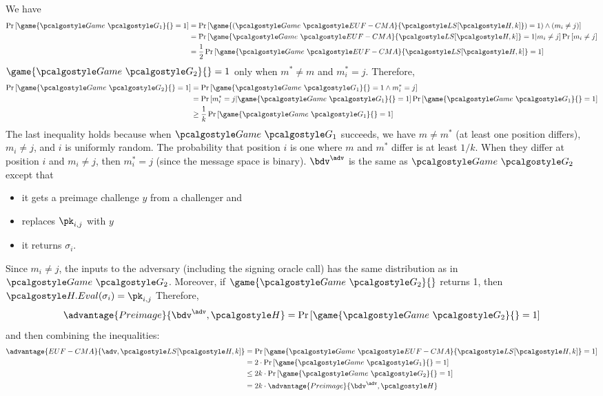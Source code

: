 \ifsolutions
\begin{mysolution}
   We have
  \begin{align*}
      \pr{\game{\Game~\algo{G_1}}{} = 1} &= \pr{\game{(\Game~\algo{EUF-CMA}}{\algo{LS[\algo{H}, k]}}) = 1) \wedge (m_i \neq j)} \\
      &= \pr{\game{\Game~\algo{EUF-CMA}}{\algo{LS[\algo{H}, k]}} = 1 | m_i \neq j} \pr{m_i \neq j} \\
      &= \frac{1}{2}\pr{\game{\Game~\algo{EUF-CMA}}{\algo{LS[\algo{H}, k]}} = 1} \\
  \end{align*}
  $\game{\Game~\algo{G_2}}{} = 1$ only when $m^* \neq m$ and $m^*_i = j$.
  Therefore,
  \begin{align*}
      \pr{\game{\Game~\algo{G_2}}{} = 1} &= \pr{\game{\Game~\algo{G_1}}{} = 1 \wedge m^*_i = j} \\
      &= \pr{m^*_i = j | \game{\Game~\algo{G_1}}{} = 1} \pr{\game{\Game~\algo{G_1}}{} = 1} \\
      &\geq \frac{1}{k}\pr{\game{\Game~\algo{G_1}}{} = 1} \\
  \end{align*}
  The last inequality holds because when $\Game~\algo{G_1}$ succeeds, we have $m \neq m^*$ (at least one position differs), $m_i \neq j$, and $i$ is uniformly random. The probability that position $i$ is one where $m$ and $m^*$ differ is at least $1/k$. When they differ at position $i$ and $m_i \neq j$, then $m^*_i = j$ (since the message space is binary).
  $\bdv^\adv$ is the same as $\Game~\algo{G_2}$ except that
  \begin{itemize}
      \item it gets a preimage challenge $y$ from a challenger and
      \item replaces $\pk_{i, j}$ with $y$
      \item it returns $\sigma_i$.
  \end{itemize}
  Since $m_i \neq j$, the inputs to the adversary (including the signing oracle call) has the same distribution as in $\Game~\algo{G_2}$.
  Moreover, if $\game{\Game~\algo{G_2}}{}$ returns 1, then $\algo{H.Eval}(\sigma_i) = \pk_{i, j}$
  Therefore,
  \[
  \advantage{Preimage}{\bdv^\adv, \algo{H}} = \pr{\game{\Game~\algo{G_2}}{} = 1}
  \]
  and then combining the inequalities:
  \begin{align*}
    \advantage{EUF-CMA}{\adv, \algo{LS}[\algo{H, k}]} &= \pr{\game{\Game~\algo{EUF-CMA}}{\algo{LS[\algo{H}, k]}} = 1} \\
    &= 2 \cdot \pr{\game{\Game~\algo{G_1}}{} = 1} \\
    &\leq 2k \cdot \pr{\game{\Game~\algo{G_2}}{} = 1} \\
    &= 2k \cdot \advantage{Preimage}{\bdv^\adv, \algo{H}}
  \end{align*}
\end{mysolution}
\fi


